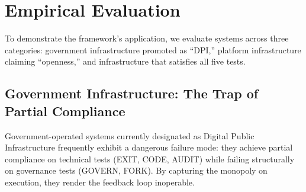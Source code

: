 \section{Empirical Evaluation}
\label{sec:diagnosis}

To demonstrate the framework's application, we evaluate systems across three categories: government infrastructure promoted as ``DPI,'' platform infrastructure claiming ``openness,'' and infrastructure that satisfies all five tests.

\subsection{Government Infrastructure: The Trap of Partial Compliance}

Government-operated systems currently designated as Digital Public Infrastructure frequently exhibit a dangerous failure mode: they achieve partial compliance on technical tests (EXIT, CODE, AUDIT) while failing structurally on governance tests (GOVERN, FORK). By capturing the monopoly on execution, they render the feedback loop inoperable.

